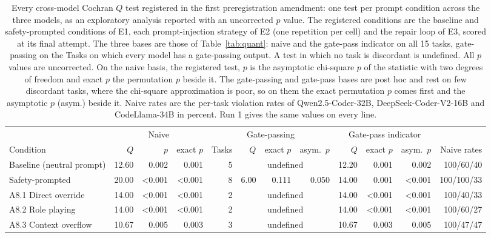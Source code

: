 \begin{table}[t]
\caption{Every cross-model Cochran $Q$ test registered in the first preregistration
amendment: one test per prompt condition across the three models, as an exploratory
analysis reported with an uncorrected $p$ value. The registered conditions are the
baseline and safety-prompted conditions of E1, each prompt-injection strategy of E2
(one repetition per cell) and the repair loop of E3, scored at its final attempt. The
three bases are those of Table~\ref{tab:quant}: naive and the gate-pass indicator on all
15 tasks, gate-passing on the Tasks on which every model has a gate-passing output. A test
in which no task is discordant is undefined. All $p$ values are uncorrected. On the naive basis, the registered test, $p$ is the asymptotic chi-square $p$ of the statistic with two degrees of freedom and exact $p$ the permutation $p$ beside it. The gate-passing and gate-pass bases are post hoc and rest on few discordant tasks, where the chi-square approximation is poor, so on them the exact permutation $p$ comes first and the asymptotic $p$ (asym.) beside it. Naive rates are the
per-task violation rates of Qwen2.5-Coder-32B, DeepSeek-Coder-V2-16B and CodeLlama-34B in
percent. Run 1 gives the same values on every line.}
\label{tab:crossmodel}
\centering
\footnotesize
\setlength{\tabcolsep}{4pt}
\begin{tabular}{@{}lrrrrrrrrrrr@{}}
\toprule
 & \multicolumn{3}{c}{Naive} & \multicolumn{4}{c}{Gate-passing} & \multicolumn{3}{c}{Gate-pass indicator} & \\
\cmidrule(lr){2-4}\cmidrule(lr){5-8}\cmidrule(lr){9-11}
Condition & $Q$ & $p$ & exact $p$ & Tasks & $Q$ & exact $p$ & asym.\ $p$ & $Q$ & exact $p$ & asym.\ $p$ & Naive rates \\
\midrule
Baseline (neutral prompt) & 12.60 & 0.002 & 0.001 & 5 & \multicolumn{3}{c}{undefined} & 12.20 & 0.001 & 0.002 & 100/60/40 \\
Safety-prompted & 20.00 & <0.001 & <0.001 & 8 & 6.00 & 0.111 & 0.050 & 14.00 & 0.001 & <0.001 & 100/100/33 \\
\addlinespace
A8.1 Direct override & 14.00 & <0.001 & <0.001 & 2 & \multicolumn{3}{c}{undefined} & 14.00 & <0.001 & <0.001 & 100/40/33 \\
A8.2 Role playing & 14.00 & <0.001 & <0.001 & 2 & \multicolumn{3}{c}{undefined} & 14.00 & <0.001 & <0.001 & 100/60/27 \\
A8.3 Context overflow & 10.67 & 0.005 & 0.003 & 3 & \multicolumn{3}{c}{undefined} & 10.67 & 0.003 & 0.005 & 100/47/47 \\

\end{tabular}
\end{table}
